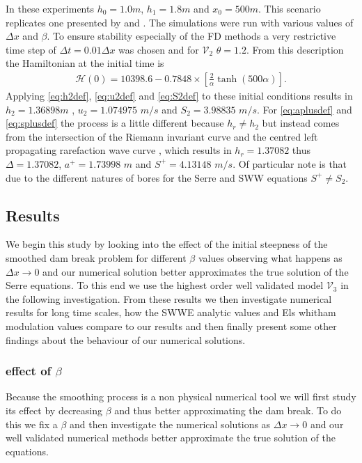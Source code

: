 \documentclass[SingleSpace,12pt,Journal]{Serre_ASCE}
\begin{document}
In these experiments $h_0 = 1.0m$, $h_1 = 1.8m$ and $x_0 = 500m$. This scenario replicates one presented by  and . The simulations were run with various values of $\Delta x$ and $\beta$. To ensure stability especially of the FD methods a very restrictive time step of $\Delta t = 0.01 \Delta x$ was chosen and for $\mathcal{V}_2$ $\theta = 1.2$. From this description the Hamiltonian at the initial time is
\begin{gather}
\label{eqn:HamilDBinit}
\mathcal{H} (0) = 10398.6 - 0.7848\times\left[\frac{2}{\alpha} \tanh\left(500 \alpha\right)\right].
\end{gather} 
Applying \eqref{eq:h2def}, \eqref{eq:u2def} and \eqref{eq:S2def} to these initial conditions results in $h_2 = 1.36898m$ , $u_2 = 1.074975$ $m/s$ and $S_2 = 3.98835$ $m/s$. For \eqref{eq:aplusdef} and \eqref{eq:splusdef} the process is a little different because $h_r \neq h_2$ but instead comes from the intersection of the Riemann invariant curve and the centred left propagating rarefaction wave curve \cite{El-etal-2006}, which results in $h_r = 1.37082$ thus $\Delta = 1.37082$,  $a^+ = 1.73998$ $m$ and $S^+ = 4.13148$ $m/s$. Of particular note is that due to the different natures of bores for the Serre and SWW equations $S^+ \neq S_2$.




\subsection{Results}

We begin this study by looking into the effect of the initial steepness of the smoothed dam break problem for different $\beta$ values observing what happens as $\Delta x \rightarrow 0$ and our numerical solution better approximates the true solution of the Serre equations. To this end we use the highest order well validated model $\mathcal{V}_3$ in the following investigation. From these results we then investigate numerical results for long time scales, how the SWWE analytic values and Els whitham modulation values compare to our results and then finally present some other findings about the behaviour of our numerical solutions.

\subsubsection{effect of $\beta$}
Because the smoothing process is a non physical numerical tool we will first study its effect by decreasing $\beta$ and thus better approximating the dam break. To do this we fix a $\beta$ and then investigate the numerical solutions as $\Delta x \rightarrow 0$ and our well validated numerical methods better approximate the true solution of the equations. %
\end{document}
